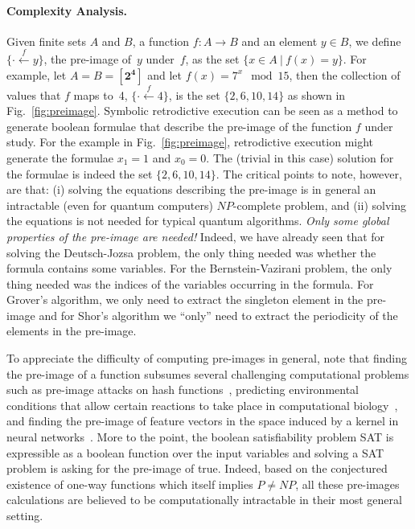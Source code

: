 \documentclass[sigplan]{acmart}
\newcommand{\preim}[2]{\{\cdot\stackrel{#1}{\longleftarrow}{#2}\}}
\newcommand{\finset}[1]{[\mathbf{#1}]}
\begin{document}
\paragraph*{Complexity Analysis.}
Given finite sets $A$ and $B$, a function $f : A \rightarrow B$ and an
element $y \in B$, we define $\preim{f}{y}$, the pre-image of~$y$
under~$f$, as the set $\{ x \in A ~|~ f(x) = y \}$. For example, let
$A = B = \finset{2^4}$ and let $f(x) = 7^x \mod 15$, then the
collection of values that $f$ maps to~4, $\preim{f}{4}$, is the set
$\{ 2, 6, 10, 14 \}$ as shown in Fig.~\ref{fig:preimage}. Symbolic
retrodictive execution can be seen as a method to generate boolean
formulae that describe the pre-image of the function $f$ under
study. For the example in Fig.~\ref{fig:preimage}, retrodictive
execution might generate the formulae $x_1=1$ and $x_0=0$. The
(trivial in this case) solution for the formulae is indeed the set $\{
2, 6, 10, 14 \}$. The critical points to note, however, are that: (i)
solving the equations describing the pre-image is in general an
intractable (even for quantum computers) $\mathit{NP}$-complete
problem, and (ii) solving the equations is not needed for typical
quantum algorithms. \emph{Only some global properties of the pre-image
  are needed!} Indeed, we have already seen that for solving the
Deutsch-Jozsa problem, the only thing needed was whether the formula
contains some variables. For the Bernstein-Vazirani problem, the only
thing needed was the indices of the variables occurring in the
formula. For Grover's algorithm, we only need to extract the singleton
element in the pre-image and for Shor's algorithm we ``only'' need to
extract the periodicity of the elements in the pre-image.

To appreciate the difficulty of computing pre-images in general, note
that finding the pre-image of a function subsumes several challenging
computational problems such as pre-image attacks on hash
functions~\cite{10.1007/978-3-540-25937-4_24}, predicting
environmental conditions that allow certain reactions to take place in
computational biology~\cite{Klotz2013,akutsu2009analyses}, and finding
the pre-image of feature vectors in the space induced by a kernel in
neural networks~\cite{1353287}. More to the point, the boolean
satisfiability problem SAT is expressible as a boolean function over
the input variables and solving a SAT problem is asking for the
pre-image of \textsf{true}. Indeed, based on the conjectured existence
of one-way functions which itself implies $\mathit{P} \neq
\mathit{NP}$, all these pre-images calculations are believed to be
computationally intractable in their most general setting.
\end{document}

